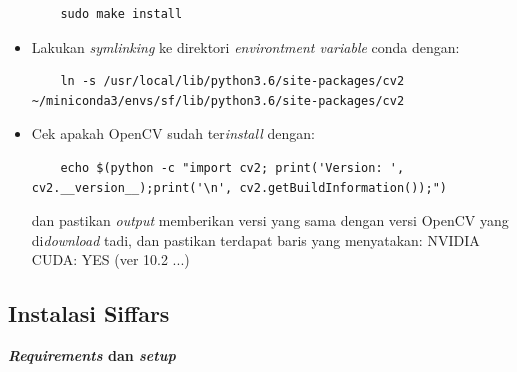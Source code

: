 \begin{itemize}
  \begin{lstlisting}
    sudo make install
  \end{lstlisting}

  \item Lakukan \textit{symlinking} ke direktori \textit{environtment variable} conda dengan:
  
  \begin{lstlisting}
    ln -s /usr/local/lib/python3.6/site-packages/cv2 ~/miniconda3/envs/sf/lib/python3.6/site-packages/cv2
  \end{lstlisting}

  \item Cek apakah OpenCV sudah ter\textit{install} dengan:
  
  \begin{lstlisting}
    echo $(python -c "import cv2; print('Version: ', cv2.__version__);print('\n', cv2.getBuildInformation());")
  \end{lstlisting}

  dan pastikan \textit{output} memberikan versi yang sama dengan versi OpenCV yang di\textit{download} tadi, dan pastikan terdapat baris yang menyatakan: NVIDIA CUDA: YES (ver 10.2 ...)

\end{itemize}

\subsection{Instalasi Siffars}
\textbf{\textit{Requirements} dan \textit{setup}}

